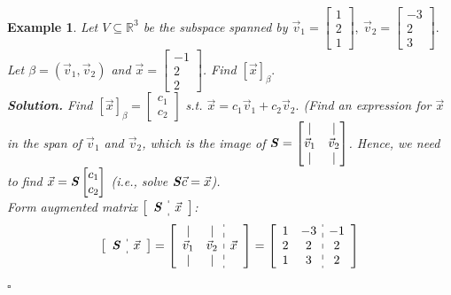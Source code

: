 \documentclass[12pt, a4paper]{article}
\newtheorem{eg}{Example}[subsection]
\newenvironment*{sol}{\indent\textbf{Solution. }}{\hfill{$\square$}\par}
\def\R{{\mathbb{R}}}
\def\vecx{\vec{x}}
\def\vecv{\vec{v}}
\def\matrixS{\textbf{\emph{S}}}
\begin{document}
\begin{eg}
	Let $V\subseteq\R^3$ be the subspace spanned by $\vecv_1=\begin{bmatrix}1\\2\\1\end{bmatrix},\ \vecv_2=\begin{bmatrix}-3\\2\\3\end{bmatrix}.$ Let $\beta=(\vecv_1,\vecv_2)$ and $\vecx=\begin{bmatrix}-1\\2\\2\end{bmatrix}$. Find $[\vecx]_\beta.$	\\
	\begin{sol}
		Find $[\vecx]_\beta=\begin{bmatrix}c_1\\c_2\end{bmatrix}$ \emph{s.t.} $\vecx=c_1\vecv_1+c_2\vecv_2.$ (Find an expression for $\vecx$ in the span of $\vecv_1$ and $\vecv_2$, which is the image of $\matrixS=\begin{bmatrix}|&|\\\vecv_1&\vecv_2\\|&|\end{bmatrix}$. Hence, we need to find $\vecx=\matrixS\begin{bmatrix}c_1\\c_2\end{bmatrix}$ (i.e., solve $\matrixS\vec{c}=\vecx$).\\
		Form augmented matrix $\left[\begin{array}{c:c}\matrixS&\vecx\end{array}\right]$: 
		$$\begin{aligned}
			\left[\begin{array}{c:c}\matrixS&\vecx\end{array}\right]&=\left[\begin{array}{c:c}\begin{matrix}|&|\\\vecv_1&\vecv_2\\|&|\end{matrix}&\vecx\end{array}\right]=\left[\begin{array}{c:c}\begin{matrix}1&-3\\2&2\\1&3\end{matrix}&\begin{matrix}-1\\2\\2\end{matrix}\end{array}\right]\\

\end{aligned}$$
\end{sol}
\end{eg}
\end{document}
